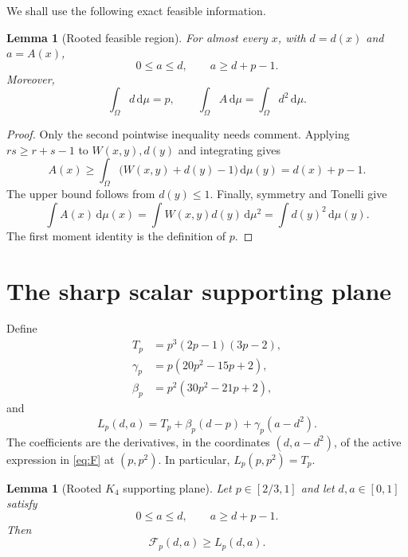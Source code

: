 \documentclass[11pt]{article}
\newtheorem{lemma}[theorem]{Lemma}
\newcommand{\dd}{\,\mathrm d}
\begin{document}
We shall use the following exact feasible information.
\begin{lemma}[Rooted feasible region]\label{lem:region}
For almost every $x$, with $d=d(x)$ and $a=A(x)$,
\[
 0\leq a\leq d,
 \qquad a\geq d+p-1.
\]
Moreover,
\[
 \int_\Omega d\dd\mu=p,
 \qquad
 \int_\Omega A\dd\mu=\int_\Omega d^2\dd\mu.
\]
\end{lemma}

\begin{proof}
Only the second pointwise inequality needs comment.  Applying
$rs\geq r+s-1$ to $W(x,y),d(y)$ and integrating gives
\[
 A(x)\geq\int_\Omega\bigl(W(x,y)+d(y)-1\bigr)\dd\mu(y)
 =d(x)+p-1.
\]
The upper bound follows from $d(y)\leq1$.  Finally, symmetry and Tonelli give
\[
 \int A(x)\dd\mu(x)
 =\int W(x,y)d(y)\dd\mu^2
 =\int d(y)^2\dd\mu(y).
\]
The first moment identity is the definition of $p$.
\end{proof}


\section{The sharp scalar supporting plane}

Define
\begin{align}
 T_p&=p^3(2p-1)(3p-2),\label{eq:T}\\
 \gamma_p&=p(20p^2-15p+2),\label{eq:gamma}\\
 \beta_p&=p^2(30p^2-21p+2),\label{eq:beta}
\end{align}
and
\begin{equation}
 L_p(d,a)=T_p+\beta_p(d-p)+\gamma_p(a-d^2).
 \label{eq:L}
\end{equation}
The coefficients are the derivatives, in the coordinates $(d,a-d^2)$,
of the active expression in \eqref{eq:F} at $(p,p^2)$.  In particular,
$L_p(p,p^2)=T_p$.

\begin{lemma}[Rooted $K_4$ supporting plane]\label{lem:scalar}
Let $p\in[2/3,1]$ and let $d,a\in[0,1]$ satisfy
\[
 0\leq a\leq d,
 \qquad a\geq d+p-1.
\]
Then
\begin{equation}
 \mathcal F_p(d,a)\geq L_p(d,a).
 \label{eq:support}
\end{equation}
\end{lemma}
\end{document}
